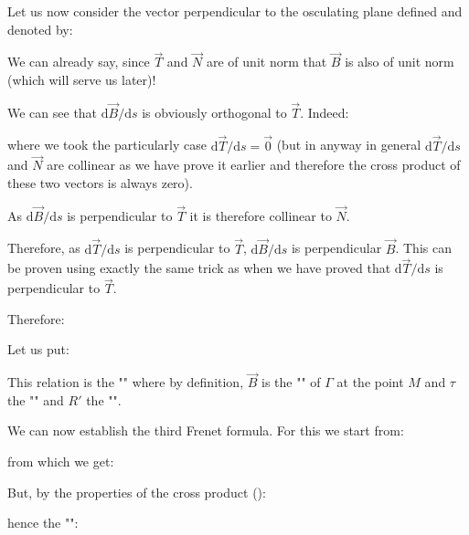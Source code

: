 {	Let us now consider the vector perpendicular to the osculating plane defined and denoted by:
	
	We can already say, since $\vec{T}$ and $\vec{N}$ are of unit norm that $\vec{B}$ is also of unit norm (which will serve us later)!
	
	We can see that $\mathrm{d}\vec{B}/\mathrm{d}s$ is obviously orthogonal to $\vec{T}$. Indeed:
	
	where we took the particularly case $\mathrm{d}\vec{T}/\mathrm{d}s=\vec{0}$  (but in anyway in general $\mathrm{d}\vec{T}/\mathrm{d}s$ and $\vec{N}$ are collinear as we have prove it earlier and therefore the cross product of these two vectors is always zero).
	
	As $\mathrm{d}\vec{B}/\mathrm{d}s$ is perpendicular to $\vec{T}$ it is therefore collinear to $\vec{N}$.
	
	Therefore, as $\mathrm{d}\vec{T}/\mathrm{d}s$ is perpendicular to $\vec{T}$, $\mathrm{d}\vec{B}/\mathrm{d}s$ is perpendicular $\vec{B}$. This can be proven using exactly the same trick as when we have proved that $\mathrm{d}\vec{T}/\mathrm{d}s$ is perpendicular to $\vec{T}$.
	
	Therefore:
	
	
	Let us put:
	
	This relation is the "" where by definition, $\vec{B}$ is the "" of $\Gamma$ at the point $M$ and $\tau$ the "" and $R'$ the "".
	
	We can now establish the third Frenet formula. For this we start from:
	
	from which we get:
	
	But, by the properties of the cross product ():
	
	hence the "":
	
}
